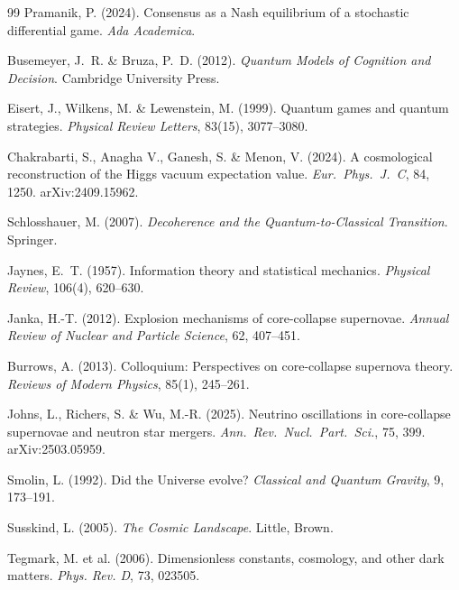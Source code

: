 \documentclass[12pt,a4paper]{article}
\theoremstyle{remark}
\begin{document}
\begin{thebibliography}{99}
Pramanik, P. (2024).
\newblock Consensus as a Nash equilibrium of a stochastic differential game.
\newblock \textit{Ada Academica}.

Busemeyer, J.~R. \& Bruza, P.~D. (2012).
\newblock \textit{Quantum Models of Cognition and Decision}.
\newblock Cambridge University Press.

Eisert, J., Wilkens, M. \& Lewenstein, M. (1999).
\newblock Quantum games and quantum strategies.
\newblock \textit{Physical Review Letters}, 83(15), 3077--3080.

Chakrabarti, S., Anagha V., Ganesh, S. \& Menon, V. (2024).
\newblock A cosmological reconstruction of the {H}iggs vacuum expectation value.
\newblock \textit{Eur.\ Phys.\ J.\ C}, 84, 1250. arXiv:2409.15962.

Schlosshauer, M. (2007).
\newblock \textit{Decoherence and the Quantum-to-Classical Transition}.
\newblock Springer.

Jaynes, E.~T. (1957).
\newblock Information theory and statistical mechanics.
\newblock \textit{Physical Review}, 106(4), 620--630.

Janka, H.-T. (2012).
\newblock Explosion mechanisms of core-collapse supernovae.
\newblock \textit{Annual Review of Nuclear and Particle Science}, 62, 407--451.

Burrows, A. (2013).
\newblock Colloquium: Perspectives on core-collapse supernova theory.
\newblock \textit{Reviews of Modern Physics}, 85(1), 245--261.

Johns, L., Richers, S. \& Wu, M.-R. (2025).
\newblock Neutrino oscillations in core-collapse supernovae and neutron star mergers.
\newblock \textit{Ann.\ Rev.\ Nucl.\ Part.\ Sci.}, 75, 399. arXiv:2503.05959.

Smolin, L. (1992).
\newblock Did the Universe evolve?
\newblock \textit{Classical and Quantum Gravity}, 9, 173--191.

Susskind, L. (2005).
\newblock \textit{The Cosmic Landscape}.
\newblock Little, Brown.

Tegmark, M. et al. (2006).
\newblock Dimensionless constants, cosmology, and other dark matters.
\newblock \textit{Phys. Rev. D}, 73, 023505.


\end{thebibliography}
\end{document}
